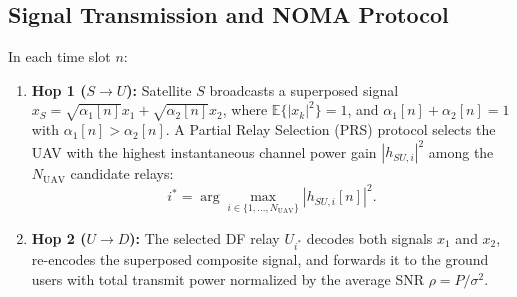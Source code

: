 \subsection{Signal Transmission and NOMA Protocol}
In each time slot $n$:
\begin{enumerate}
    \item \textbf{Hop 1 ($S \to U$):} Satellite $S$ broadcasts a superposed signal $x_S = \sqrt{\alpha_1[n]} x_1 + \sqrt{\alpha_2[n]} x_2$, where $\mathbb{E}\{|x_k|^2\} = 1$, and $\alpha_1[n] + \alpha_2[n] = 1$ with $\alpha_1[n] > \alpha_2[n]$. A Partial Relay Selection (PRS) protocol selects the UAV with the highest instantaneous channel power gain $|h_{SU, i}|^2$ among the $N_{\text{UAV}}$ candidate relays:
    \begin{equation}
        i^* = \arg\max_{i \in \{1, \dots, N_{\text{UAV}}\}} |h_{SU, i}[n]|^2.
    \end{equation}
    \item \textbf{Hop 2 ($U \to D$):} The selected DF relay $U_{i^*}$ decodes both signals $x_1$ and $x_2$, re-encodes the superposed composite signal, and forwards it to the ground users with total transmit power normalized by the average SNR $\rho = P/\sigma^2$.
\end{enumerate}

